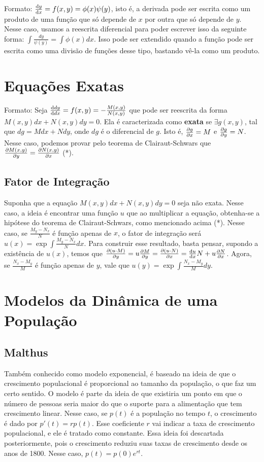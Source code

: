\documentclass[12pt]{article}
\begin{document}
Formato: $\dv{y}{x} = f(x,y) = \phi(x)\psi(y)$, isto é, a derivada pode ser
escrita como um produto de uma função que só depende de $x$ por outra que só
depende de $y$. Nesse caso, usamos a reescrita diferencial para poder escrever
isso da seguinte forma: $\int \frac{dy}{\psi(y)} = \int \phi(x)dx$. Isso pode
ser extendido quando a função pode ser escrita como uma divisão de funções
desse tipo, bastando vê-la como um produto.  

\section{Equações Exatas}

Formato: Seja $\dv{dy}{dx} = f(x,y) = - \frac{M(x,y)}{N(x,y)}$ que pode ser
reescrita da forma $M(x,y)dx + N(x,y)dy = 0$. Ela é caracterizada como
\textbf{exata} se $\exists g(x,y)$, tal que $dg = Mdx + Ndy$, onde $dg$ é o
diferencial de $g$. Isto é, $\pdv{g}{x} = M$ e $\pdv{g}{y} = N$. Nesse caso,
podemos provar pelo teorema de Clairaut-Schwars que $\pdv{M(x,y)}{y} =
\pdv{N(x,y)}{x}$ (*). 

\subsection{Fator de Integração}

Suponha que a equação $M(x,y)dx + N(x,y)dy = 0$ seja não exata. Nesse caso, a
ideia é encontrar uma função $u$ que ao multiplicar a equação, obtenha-se a
hipótese do teorema de Clairaut-Schwars, como mencionado acima (*). Nesse
caso, se $\frac{M_y - N_x}{N}$ é função apenas de $x$, o fator de integração
será $u(x) = \exp{\int \frac{M_y - N_x}{N}dx}$. Para construir esse resultado,
basta pensar, supondo a existência de $u(x)$, temos que $\pdv{(u\cdot M)}{y} =
u\pdv{M}{y} = \pdv{(u\cdot N)}{x} = \dv{u}{x}N + u\pdv{N}{x}$. Agora, se $\frac{N_x
- M_y}{M}$ é função apenas de $y$, vale que $u(y) = \exp{\int \frac{N_x -
M_y}{M}dy}$. 

\section{Modelos da Dinâmica de uma População}

\subsection{Malthus} 
Também conhecido como modelo exponencial, é
baseado na ideia de que o crescimento populacional é proporcional ao
tamanho da população, o que faz um certo sentido. O modelo é parte da
ideia de que existiria um ponto em que o número de pessoas seria maior do
que o suporte para a alimentação que tem crescimento linear. Nesse caso,
se $p(t)$ é a população no tempo $t$, o crescimento é dado por $p'(t) =
rp(t)$. Esse coeficiente $r$ vai indicar a taxa de crescimento
populacional, e ele é tratado como constante. Essa ideia foi descartada
posteriormente, pois o crescimento reduziu suas taxas de crescimento desde
os anos de 1800. Nesse caso, $p(t) = p(0)e^{rt}$. 
\end{document}
